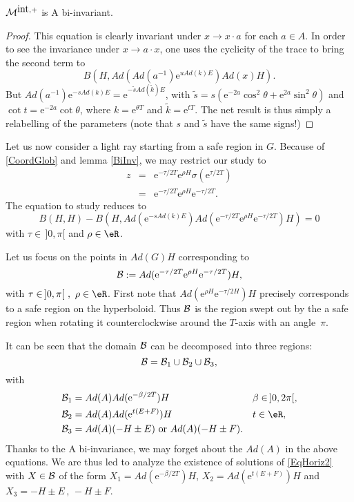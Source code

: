 \begin{lemma}
${\cal M}^{\mbox{int},+}$ is A bi-invariant.
\label{BiInv}
\end{lemma}
 \begin{proof}
 This equation is clearly invariant under $x \to x\cdot a$ for each $a\in A$. In order to see the invariance under $x \to a\cdot x$, one uses the cyclicity of the trace to bring the second term to
\[
 B(H,Ad(Ad(a^{-1})\mbox{e}^{u Ad(k)E}) Ad(x) H).
\]
But $Ad(a^{-1})\mbox{e}^{-s Ad(k)E} = \mbox{e}^{-\tilde{s} Ad(\tilde{k})E}$, with $\tilde{s} = s (\mbox{e}^{-2a} \cos^2\theta + \mbox{e}^{2a} \sin^2 \theta)$ and $\cot t = \mbox{e}^{-2a} \cot \theta$, where $k = \mbox{e}^{\theta T}$ and $\tilde{k}=\mbox{e}^{t T}$. The net result is thus simply a relabelling of the parameters (note that $s$ and $\tilde{s}$ have the same signs!)
\end{proof}

Let us now consider a light ray starting from a safe region in $G$. Because of \eqref{CoordGlob} and lemma \ref{BiInv}, we may restrict our study to
\begin{eqnarray}
 z &=& \mbox{e}^{-\tau/2 T} \mbox{e}^{\rho H} \sigma(\mbox{e}^{\tau/2 T}) \\
 &=& \mbox{e}^{-\tau/2 T} \mbox{e}^{\rho H} \mbox{e}^{-\tau/2 T}.
 \end{eqnarray}
The equation to study reduces to
\begin{equation}\label{EqHoriz2}
B(H,H) - B(H,Ad(\mbox{e}^{-s Ad(k)E}) Ad(\mbox{e}^{-\tau/2 T}
\mbox{e}^{\rho H} \mbox{e}^{-\tau/2 T}) H) = 0
\end{equation}
with $\tau\in \, ]0,\pi[$ and  $\rho \in \eR$.

Let us focus on the points in $Ad(G)H$ corresponding to
\[
{\cal B}:= Ad(\mbox{e}^{-\tau/2 T} \mbox{e}^{\rho H} \mbox{e}^{-\tau/2 T})H,
\]
with $\tau \in \, ]0,\pi[ \,\, , \,\, \rho \in \eR$. First note that $Ad(\mbox{e}^{\rho H} \mbox{e}^{-\tau/2 H}) H$ precisely corresponds to a safe region on the hyperboloid. Thus ${\cal B}$ is the region swept out by the a safe region when rotating it counterclockwise around the $T$-axis with an angle~$\pi$.  

It can be seen that the domain ${\cal B}$ can be decomposed into three regions:
\begin{equation}
 {\cal B} = {\cal B}_1 \cup {\cal B}_2 \cup {\cal B}_3,
 \end{equation}
with
\begin{subequations}
\begin{align}
{\cal B}_1 &=Ad(A)Ad(\mbox{e}^{-\beta/2 T})H &&   \beta \in \, ]0,2\pi[,\\
{\cal B}_2 &=Ad(A)Ad(\mbox{e}^{t (E+F)})H    &&    t\in \eR, \\
{\cal B}_3 &=Ad(A)(-H \pm E) \textrm{ or } Ad(A)(-H \pm F).
\end{align}
\end{subequations}
Thanks to the A bi-invariance, we may forget about the $Ad(A)$ in the above equations. We are thus led to analyze the existence of solutions of \eqref{EqHoriz2} with $X \in {\cal B}$ of the form $X_1 = Ad(\mbox{e}^{-\beta/2 T})H$, $X_2 =Ad(\mbox{e}^{t (E+F)})H$ and $X_3 =-H \pm E \, , \, -H \pm F$.

